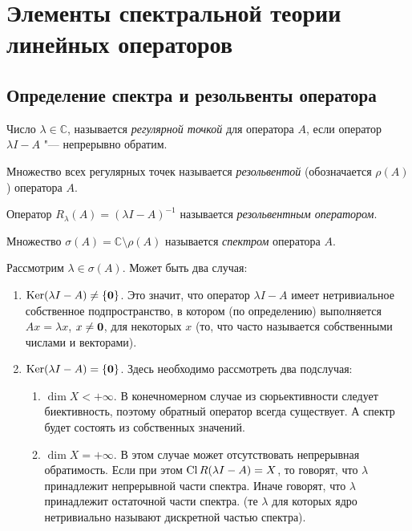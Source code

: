 \section{Элементы спектральной теории линейных операторов}

\subsection{Определение спектра и резольвенты оператора}

\begin{definition}
    Число $\lambda \in \mathbb{C}$, называется \emph{регулярной точкой}
    для оператора $A$, если оператор $\lambda I - A$ "--- непрерывно обратим.
\end{definition}

\begin{definition}[резольвента]
    Множество всех регулярных точек называется \emph{резольвентой} (обозначается $\rho(A)$)
    оператора $A$.
\end{definition}

\begin{definition}
    Оператор $R_\lambda(A) = \left( \lambda I - A\right)^{-1}$ называется
    \emph{резольвентным оператором}.
\end{definition}

\begin{definition}[спектр]
    Множество $\sigma(A) = \mathbb{C} \setminus \rho(A)$ называется
    \emph{спектром} оператора $A$.
\end{definition}

Рассмотрим $\lambda \in \sigma(A)$. Может быть два случая:
\begin{enumerate}
    \item
    $\operatorname{Ker} (\lambda I - A) \neq \left\{ \bf{0}\right\}$. Это значит, что оператор
    $\lambda I - A$ имеет нетривиальное собственное подпространство, в котором (по определению)
    выполняется $Ax=\lambda x$, $x \neq \bf{0}$, для некоторых $x$
    (то, что часто называется собственными числами и векторами).
    \item
    $\operatorname{Ker} (\lambda I - A) = \left\{ \bf{0}\right\}$.
    Здесь необходимо рассмотреть два подслучая:
    \begin{enumerate}
        \item
        $\dim X < +\infty$. В конечномерном случае из сюрьективности следует
        биективность, поэтому обратный оператор всегда существует.
        А спектр будет состоять из собственных значений.
        \item
        $\dim X = +\infty$. В этом случае может отсутствовать непрерывная обратимость.
        Если при этом $\operatorname{Cl} R(\lambda I - A) = X$, то говорят, что $\lambda$
        принадлежит непрерывной части спектра. Иначе говорят, что
        $\lambda$ принадлежит остаточной части спектра.
        (те $\lambda$ для которых ядро нетривиально называют дискретной частью спектра).
    \end{enumerate}
\end{enumerate}

